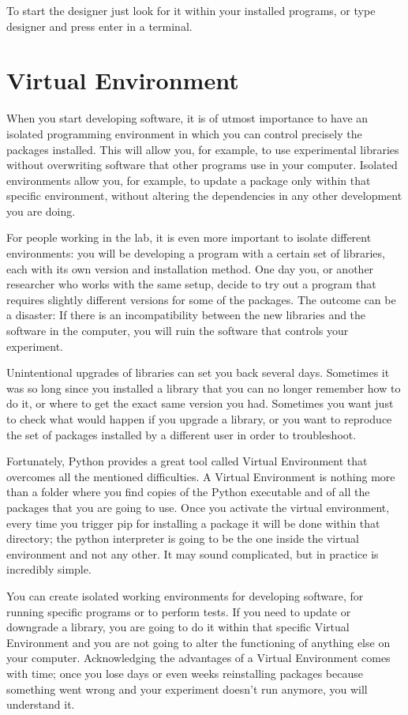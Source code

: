 To start the designer just look for it within your installed programs, or type designer and press enter in a terminal.

\section{Virtual Environment}
When you start developing software, it is of utmost importance to have an isolated programming environment in which you can control precisely the packages installed. This will allow you, for example, to use experimental libraries without overwriting software that other programs use in your computer. Isolated environments allow you, for example, to update a package only within that specific environment, without altering the dependencies in any other development you are doing.

For people working in the lab, it is even more important to isolate different environments: you will be developing a program with a certain set of libraries, each with its own version and installation method. One day you, or another researcher who works with the same setup, decide to try out a program that requires slightly different versions for some of the packages. The outcome can be a disaster: If there is an incompatibility between the new libraries and the software in the computer, you will ruin the software that controls your experiment.

Unintentional upgrades of libraries can set you back several days. Sometimes it was so long since you installed a library that you can no longer remember how to do it, or where to get the exact same version you had. Sometimes you want just to check what would happen if you upgrade a library, or you want to reproduce the set of packages installed by a different user in order to troubleshoot.

Fortunately, Python provides a great tool called Virtual Environment that overcomes all the mentioned difficulties. A Virtual Environment is nothing more than a folder where you find copies of the Python executable and of all the packages that you are going to use. Once you activate the virtual environment, every time you trigger pip for installing a package it will be done within that directory; the python interpreter is going to be the one inside the virtual environment and not any other. It may sound complicated, but in practice is incredibly simple.

You can create isolated working environments for developing software, for running specific programs or to perform tests. If you need to update or downgrade a library, you are going to do it within that specific Virtual Environment and you are not going to alter the functioning of anything else on your computer. Acknowledging the advantages of a Virtual Environment comes with time; once you lose days or even weeks reinstalling packages because something went wrong and your experiment doesn’t run anymore, you will understand it.

